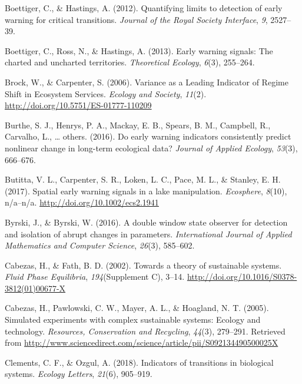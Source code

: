\documentclass[12pt,twoside,openany]{reedthesis}
\begin{document}
\hypertarget{ref-boettiger_quantifying_2012}{}
Boettiger, C., \& Hastings, A. (2012). Quantifying limits to detection
of early warning for critical transitions. \emph{Journal of the Royal
Society Interface}, \emph{9}, 2527--39.

\hypertarget{ref-boettiger_early_2013}{}
Boettiger, C., Ross, N., \& Hastings, A. (2013). Early warning signals:
The charted and uncharted territories. \emph{Theoretical Ecology},
\emph{6}(3), 255--264.

\hypertarget{ref-brock_variance_2006}{}
Brock, W., \& Carpenter, S. (2006). Variance as a Leading Indicator of
Regime Shift in Ecosystem Services. \emph{Ecology and Society},
\emph{11}(2). \url{http://doi.org/10.5751/ES-01777-110209}

\hypertarget{ref-burthe2016early}{}
Burthe, S. J., Henrys, P. A., Mackay, E. B., Spears, B. M., Campbell,
R., Carvalho, L., \ldots{} others. (2016). Do early warning indicators
consistently predict nonlinear change in long-term ecological data?
\emph{Journal of Applied Ecology}, \emph{53}(3), 666--676.

\hypertarget{ref-butitta_spatial_2017}{}
Butitta, V. L., Carpenter, S. R., Loken, L. C., Pace, M. L., \& Stanley,
E. H. (2017). Spatial early warning signals in a lake manipulation.
\emph{Ecosphere}, \emph{8}(10), n/a--n/a.
\url{http://doi.org/10.1002/ecs2.1941}

\hypertarget{ref-byrski2016double}{}
Byrski, J., \& Byrski, W. (2016). A double window state observer for
detection and isolation of abrupt changes in parameters.
\emph{International Journal of Applied Mathematics and Computer
Science}, \emph{26}(3), 585--602.

\hypertarget{ref-cabezas_towards_2002}{}
Cabezas, H., \& Fath, B. D. (2002). Towards a theory of sustainable
systems. \emph{Fluid Phase Equilibria}, \emph{194}(Supplement C), 3--14.
\url{http://doi.org/10.1016/S0378-3812(01)00677-X}

\hypertarget{ref-cabezas_simulated_2005}{}
Cabezas, H., Pawlowski, C. W., Mayer, A. L., \& Hoagland, N. T. (2005).
Simulated experiments with complex sustainable systems: Ecology and
technology. \emph{Resources, Conservation and Recycling}, \emph{44}(3),
279--291. Retrieved from
\url{http://www.sciencedirect.com/science/article/pii/S092134490500025X}

\hypertarget{ref-clements2018indicators}{}
Clements, C. F., \& Ozgul, A. (2018). Indicators of transitions in
biological systems. \emph{Ecology Letters}, \emph{21}(6), 905--919.
\end{document}
